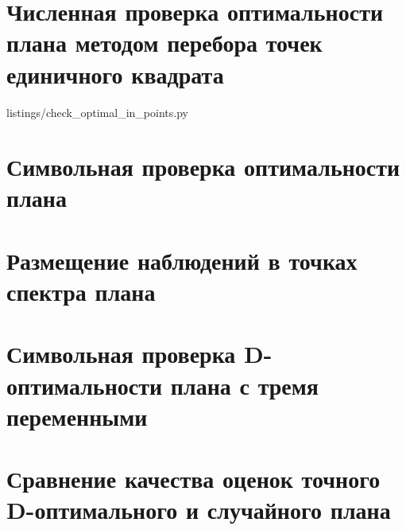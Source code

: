 \appendix

\section{Численная проверка оптимальности плана методом перебора точек единичного квадрата}
\label{appendix:check_optimal_in_points}

{listings/check_optimal_in_points.py}

\cleardoublepage


\section{Символьная проверка оптимальности плана}
\label{appendix:symbol_check_optimal_in_points}


\cleardoublepage

\section{Размещение наблюдений в точках спектра плана}
\label{appendix:check_ns}


\cleardoublepage

\section{Символьная проверка D-оптимальности плана с тремя переменными}
\label{appendix:3x_cube}


\cleardoublepage

\section{Сравнение качества оценок точного D-оптимального и случайного плана}
\label{appendix:heteroscedastic_experiment}

